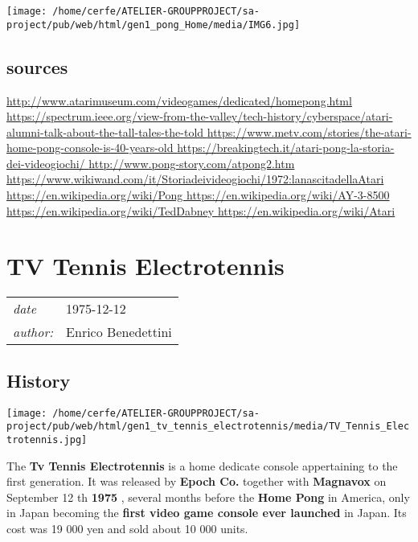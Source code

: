 \documentclass[a4paper,10pt]{book}
\newcommand{\pageHeader}[4]{
    \section{#1}
    \vspace{-0.3cm}
    \begin{table}[h!]
     \begin{tabular}{ll}
        \hline
        \textit{date} & #2 \\
        \textit{author: } & #3\\
        \hline
     \end{tabular}
    \end{table}
    \vspace{-0.3cm}
}
\begin{document}
 
 \texttt{[image: /home/cerfe/ATELIER-GROUPPROJECT/sa-project/pub/web/html/gen1\_pong\_Home/media/IMG6.jpg]}
 
 
 \subsection{sources }
 
 \href{http://www.atarimuseum.com/videogames/dedicated/homepong.html}{http://www.atarimuseum.com/videogames/dedicated/homepong.html }
 \href{https://spectrum.ieee.org/view-from-the-valley/tech-history/cyberspace/atari-alumni-talk-about-the-tall-tales-the-told}{https://spectrum.ieee.org/view-from-the-valley/tech-history/cyberspace/atari-alumni-talk-about-the-tall-tales-the-told }
 \href{https://www.metv.com/stories/the-atari-home-pong-console-is-40-years-old}{https://www.metv.com/stories/the-atari-home-pong-console-is-40-years-old }
 \href{https://breakingtech.it/atari-pong-la-storia-dei-videogiochi/}{https://breakingtech.it/atari-pong-la-storia-dei-videogiochi/ }
 \href{http://www.pong-story.com/atpong2.htm}{http://www.pong-story.com/atpong2.htm }
 \href{https://www.wikiwand.com/it/Storia_dei_videogiochi#/1972:_la_nascita_della_Atari}{https://www.wikiwand.com/it/Storiadeivideogiochi/1972:lanascitadellaAtari }
 \href{https://en.wikipedia.org/wiki/Pong}{https://en.wikipedia.org/wiki/Pong }
 \href{https://en.wikipedia.org/wiki/AY-3-8500}{https://en.wikipedia.org/wiki/AY-3-8500 }
 \href{https://en.wikipedia.org/wiki/Ted_Dabney}{https://en.wikipedia.org/wiki/TedDabney }
 \href{https://en.wikipedia.org/wiki/Atari}{https://en.wikipedia.org/wiki/Atari }
 
 \newpage\pageHeader{TV Tennis Electrotennis}{1975-12-12}{Enrico Benedettini}{The first japanese home console ever.}
 \subsection{History }
 \texttt{[image: /home/cerfe/ATELIER-GROUPPROJECT/sa-project/pub/web/html/gen1\_tv\_tennis\_electrotennis/media/TV\_Tennis\_Electrotennis.jpg]}
 
          The  \textbf{Tv Tennis Electrotennis }  is a home dedicate console appertaining to the first generation.
          It was released by  \textbf{Epoch Co. }  together with  \textbf{Magnavox }  on  September 12 th 
 \textbf{1975 } , several months before the  \textbf{Home Pong }  in America, only in Japan becoming
          the  \textbf{first video game console ever launched }  in Japan.  
          Its cost was 19 000 yen and sold about 10 000 units.
         
\end{document}
